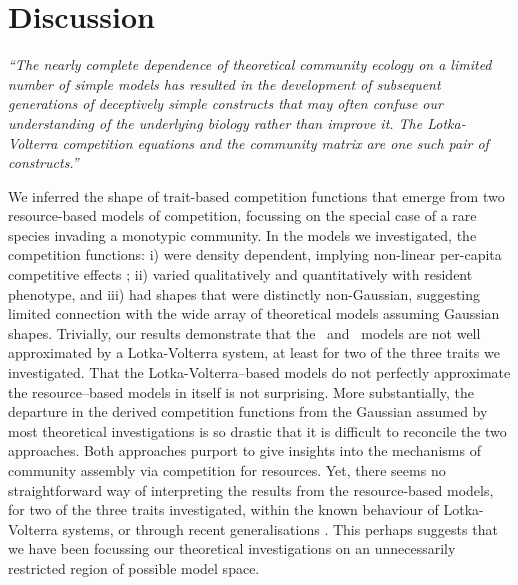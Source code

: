\documentclass[a4paper,11pt]{article}
\begin{document}

\section{Discussion}


\emph{``The nearly complete dependence of theoretical community ecology on a
limited number of simple models has resulted in the development of subsequent
generations of deceptively simple constructs that may often confuse our
understanding of the underlying biology rather than improve it. The
Lotka-Volterra competition equations and the community matrix are one such
pair of constructs.''} \citep{Neill-1974}

We inferred the shape of trait-based competition functions that emerge
from two resource-based models of competition, focussing on the
special case of a rare species invading a monotypic community.
%
In the models we investigated, the competition functions: i) were
density dependent, implying non-linear per-capita competitive effects
\citep{Abrams-1980}; ii) varied qualitatively and quantitatively with
resident phenotype,
and iii) had shapes that were distinctly non-Gaussian, suggesting
limited connection with the wide array of theoretical models assuming
Gaussian shapes.
%
Trivially, our results demonstrate that the \Rstar\ and \plant\ models
are not well approximated by a Lotka-Volterra system, at least for two
of the three traits we investigated. That the Lotka-Volterra--based
models do not perfectly approximate the resource--based models in
itself is not surprising.
%
More substantially, the departure in the derived competition functions
from the Gaussian assumed by most theoretical investigations
is so drastic that it is difficult to reconcile the two approaches.
Both approaches purport to give insights into the mechanisms of
community assembly via competition for resources.  Yet, there seems no
straightforward way of interpreting the results from the
resource-based models, for two of the three traits investigated,
within the known behaviour of Lotka-Volterra systems, or through
recent generalisations \citep{Leimar-2013}. This perhaps suggests that
we have been focussing our theoretical investigations on an
unnecessarily restricted region of possible model space.
\end{document}
